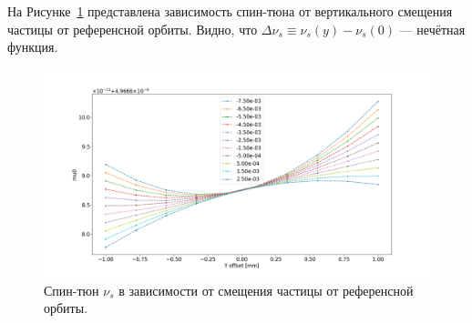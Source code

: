 На Рисунке~\ref{fig:spin_tune_vs_y0_GSY} представлена зависимость спин-тюна от вертикального смещения частицы от референсной орбиты. Видно, что $\Delta\nu_s \equiv \nu_s(y) - \nu_s(0)$ --- нечётная функция.
\begin{figure}[h!]
	\centering
	\hfill
	\includegraphics[width=\linewidth]{images/decoh_sim/spin_tune_vs_offset}
	\hfill
	\caption{Спин-тюн $\nu_s$ в зависимости от смещения частицы от референсной орбиты.\label{fig:spin_tune_vs_y0_GSY}}
\end{figure}

